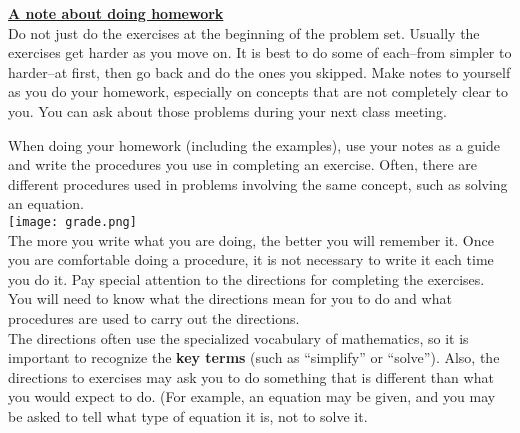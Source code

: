 \documentclass[12pt a4paper]{article}
\begin{document}
\begin{dashedbox}
\vspace{0.3cm}
\LARGE \textbf{\uline{A note about doing homework}} \vspace{0.5cm} \\
\LARGE Do not just do the exercises at the beginning of the problem set. Usually the exercises get harder as you move on. It is best to do some of each--from simpler to harder--at first, then go back and do the ones you skipped. Make notes to yourself as you do your homework, especially on concepts that are not completely clear to you. You can ask about those problems during your next class meeting.
\vspace{0.3cm}
\end{dashedbox}

\newpage

\setlength{\columnsep}{0.8cm}
\begin{multicols*}{2}
\noindent
When doing your homework (including the examples), use your notes as a guide
and write the procedures you use in completing an exercise. Often, there are different procedures used in problems involving the same concept, such as
solving an equation. \\
\newline
    \texttt{[image: grade.png]} \\
\newline
The more you write what you are doing, the better you will remember it. Once you are comfortable doing a procedure, it is not necessary to write it each time you do it. Pay special attention to the directions for completing the exercises. You will need to know what the directions mean for you to do and
what procedures are used to carry out the directions.\\ \newline
The directions often use the specialized vocabulary of mathematics, so it is important to recognize the \textbf{key terms} (such as “simplify” or “solve”). Also, the directions to exercises may ask you to do something that is different than what you would expect to do. (For example, an equation may be given, and you may be asked to tell what type of equation it is, not to solve it. 
\end{multicols*}
\end{document}
